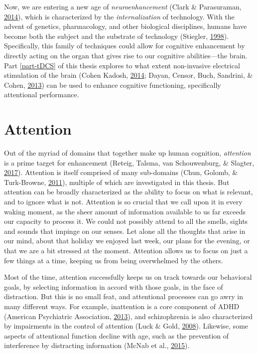\documentclass[12pt,a4paper,]{memoir}
\begin{document}
Now, we are entering a new age of \emph{neuroenhancement} (Clark \& Parasuraman, \protect\hyperlink{ref-Clark2014}{2014}), which is characterized by the \emph{internalization} of technology. With the advent of genetics, pharmacology, and other biological disciplines, humans have become both the subject and the substrate of technology (Stiegler, \protect\hyperlink{ref-Stiegler1998}{1998}). Specifically, this family of techniques could allow for cognitive enhancement by directly acting on the organ that gives rise to our cognitive abilities---the brain. Part \ref{part-tDCS} of this thesis explores to what extent non-invasive electrical stimulation of the brain (Cohen Kadosh, \protect\hyperlink{ref-CohenKadosh2014}{2014}; Dayan, Censor, Buch, Sandrini, \& Cohen, \protect\hyperlink{ref-Dayan2013}{2013}) can be used to enhance cognitive functioning, specifically attentional performance.

\hypertarget{attention}{%
\section{Attention}\label{attention}}

Out of the myriad of domains that together make up human cognition, \emph{attention} is a prime target for enhancement (Reteig, Talsma, van Schouwenburg, \& Slagter, \protect\hyperlink{ref-Reteig2017}{2017}). Attention is itself comprised of many sub-domains (Chun, Golomb, \& Turk-Browne, \protect\hyperlink{ref-Chun2011}{2011}), multiple of which are investigated in this thesis. But attention can be broadly characterized as the ability to focus on what is relevant, and to ignore what is not. Attention is so crucial that we call upon it in every waking moment, as the sheer amount of information available to us far exceeds our capacity to process it. We could not possibly attend to all the smells, sights and sounds that impinge on our senses. Let alone all the thoughts that arise in our mind, about that holiday we enjoyed last week, our plans for the evening, or that we are a bit stressed at the moment. Attention allows us to focus on just a few things at a time, keeping us from being overwhelmed by the others.

Most of the time, attention successfully keeps us on track towards our behavioral goals, by selecting information in accord with those goals, in the face of distraction. But this is no small feat, and attentional processes can go awry in many different ways. For example, inattention is a core component of ADHD (American Psychiatric Association, \protect\hyperlink{ref-AmericanPsychiatricAssociation2013}{2013}), and schizophrenia is also characterized by impairments in the control of attention (Luck \& Gold, \protect\hyperlink{ref-Luck2008}{2008}). Likewise, some aspects of attentional function decline with age, such as the prevention of interference by distracting information (McNab et al., \protect\hyperlink{ref-McNab2015}{2015}).
\end{document}
